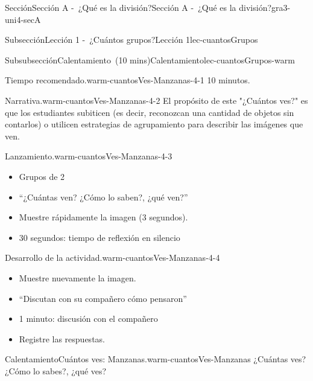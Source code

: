 \documentclass[oneside,10pt,]{article}
\begin{document}
\begin{sectionptx}{Sección}{Sección A -~¿Qué es la división?}{}{Sección A -~¿Qué es la división?}{}{}{gra3-uni4-secA}
\begin{subsectionptx}{Subsección}{Lección 1 -~¿Cuántos grupos?}{}{Lección 1}{}{}{lec-cuantosGrupos}
\begin{subsubsectionptx}{Subsubsección}{Calentamiento~(10 mins)}{}{Calentamiento}{}{}{lec-cuantosGrupos-warm}
\begin{paragraphs}{Tiempo recomendado.}{warm-cuantosVes-Manzanas-4-1}
10 minutos.%
\end{paragraphs}%
\begin{paragraphs}{Narrativa.}{warm-cuantosVes-Manzanas-4-2}%
El propósito de este "¿Cuántos ves?" es que los estudiantes subiticen (es decir, reconozcan una cantidad de objetos sin contarlos) o utilicen estrategias de agrupamiento para describir las imágenes que ven.%
\end{paragraphs}%
\begin{paragraphs}{Lanzamiento.}{warm-cuantosVes-Manzanas-4-3}%
%
\begin{itemize}[label=\textbullet]
\item{}Grupos de 2%
\item{}``¿Cuántas ven? ¿Cómo lo saben?, ¿qué ven?''%
\item{}Muestre rápidamente la imagen (3 segundos).%
\item{}30 segundos: tiempo de reflexión en silencio%
\end{itemize}
\end{paragraphs}%
\begin{paragraphs}{Desarrollo de la actividad.}{warm-cuantosVes-Manzanas-4-4}%
%
\begin{itemize}[label=\textbullet]
\item{}Muestre nuevamente la imagen.%
\item{}``Discutan con su compañero cómo pensaron''%
\item{}1 minuto: discusión con el compañero%
\item{}Registre las respuestas.%
\end{itemize}
\end{paragraphs}%
\begin{exploration}{Calentamiento}{Cuántos ves: Manzanas.}{warm-cuantosVes-Manzanas}%
¿Cuántas ves?\\
 ¿Cómo lo sabes?, ¿qué ves?%
\begin{image}{0}{1}{0}{}%

\end{image}
\end{exploration}
\end{subsubsectionptx}
\end{subsectionptx}
\end{sectionptx}
\end{document}
